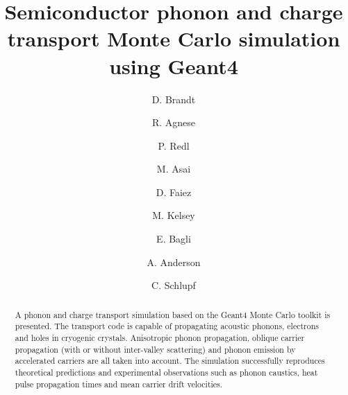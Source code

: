 \documentclass[final,3p,times,twocolumn]{elsarticle}
\begin{document}
\begin{frontmatter}


\author{D. Brandt }
\author{R. Agnese }
\author{P. Redl }
\author{M. Asai }
\author{D. Faiez }
\author{M. Kelsey }
\author{E. Bagli }
\author{A. Anderson }
\author{C. Schlupf }



\title{Semiconductor phonon and charge transport Monte Carlo simulation using Geant4}


\author{}

\address{}

\begin{abstract}

A phonon and charge transport simulation based on the Geant4 Monte Carlo toolkit is presented. The transport code is capable of propagating acoustic phonons, electrons and holes in cryogenic crystals. Anisotropic phonon propagation, oblique carrier propagation (with or without inter-valley scattering) and phonon emission by accelerated carriers are all taken into account. The simulation successfully reproduces theoretical predictions and experimental observations such as phonon caustics, heat pulse propagation times and mean carrier drift velocities.


\end{abstract}
\end{frontmatter}
\end{document}
